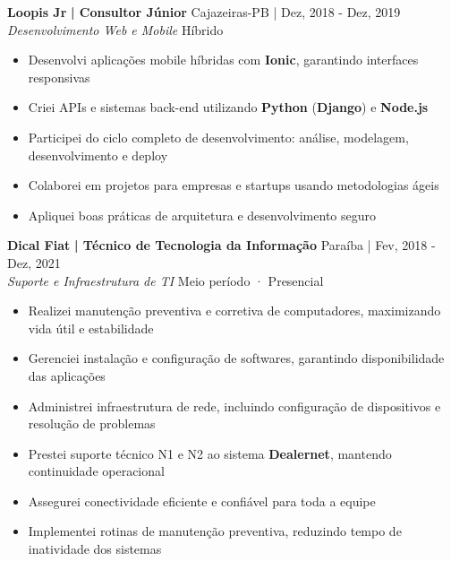 \documentclass[a4paper]{article}
\begin{document}
\textbf{Loopis Jr}\textbf{ | Consultor Júnior} \hfill Cajazeiras-PB | Dez, 2018 - Dez, 2019\\
\textit{Desenvolvimento Web e Mobile} \hfill Híbrido\\
\vspace{-3mm}
\begin{itemize} \itemsep -3pt
    \item Desenvolvi aplicações mobile híbridas com \textbf{Ionic}, garantindo interfaces responsivas
    \item Criei APIs e sistemas back-end utilizando \textbf{Python} (\textbf{Django}) e \textbf{Node.js}
    \item Participei do ciclo completo de desenvolvimento: análise, modelagem, desenvolvimento e deploy
    \item Colaborei em projetos para empresas e startups usando metodologias ágeis
    \item Apliquei boas práticas de arquitetura e desenvolvimento seguro
\end{itemize}

\textbf{Dical Fiat}\textbf{ | Técnico de Tecnologia da Informação} \hfill Paraíba | Fev, 2018 - Dez, 2021\\
\textit{Suporte e Infraestrutura de TI} \hfill Meio período · Presencial\\
\vspace{-3mm}
\begin{itemize} \itemsep -3pt
    \item Realizei manutenção preventiva e corretiva de computadores, maximizando vida útil e estabilidade
    \item Gerenciei instalação e configuração de softwares, garantindo disponibilidade das aplicações
    \item Administrei infraestrutura de rede, incluindo configuração de dispositivos e resolução de problemas
    \item Prestei suporte técnico N1 e N2 ao sistema \textbf{Dealernet}, mantendo continuidade operacional
    \item Assegurei conectividade eficiente e confiável para toda a equipe
    \item Implementei rotinas de manutenção preventiva, reduzindo tempo de inatividade dos sistemas
\end{itemize}
\end{document}
